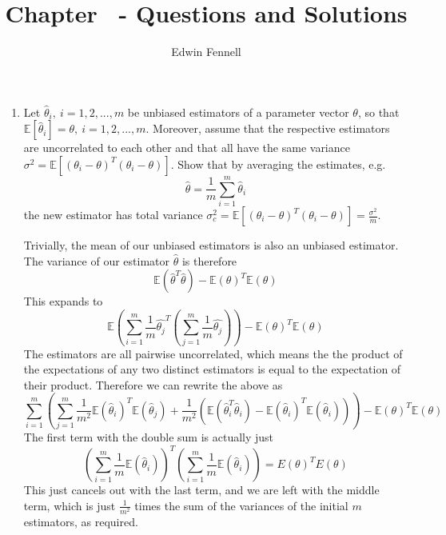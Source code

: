 \documentclass{article}
\title{Chapter \chapternumber\ - Questions and Solutions}
\author{Edwin Fennell}
\date{}
\newcommand{\chapternumber}{3}
\newenvironment{QandA}{\begin{enumerate}[label=\chapternumber.\arabic*]\bfseries\boldmath}
	{\end{enumerate}}
\newenvironment{answered}{\par\bigskip\normalfont\unboldmath}{}
\begin{document}
	
	\maketitle
	
	\noindent%
	\begin{QandA}
		\item Let $\hat{\theta}_i,\ i=1,2,...,m$ be unbiased estimators of a parameter vector $\theta$, so that $\mathbb{E}[\hat{\theta}_i]=\theta,\ i=1,2,...,m$. Moreover, assume that the respective estimators are uncorrelated to each other and that all have the same variance $\sigma^2=\mathbb{E}[(\theta_i-\theta)^T(\theta_i-\theta)]$. Show that by averaging the estimates, e.g.
		\[\hat{\theta}=\frac{1}{m}\sum_{i=1}^{m}\hat{\theta}_i\]
		the new estimator has total variance $\sigma_c^2=\mathbb{E}[(\theta_i-\theta)^T(\theta_i-\theta)]=\frac{\sigma^2}{m}$.
		\begin{answered}
			Trivially, the mean of our unbiased estimators is also an unbiased estimator. The variance of our estimator $\hat{\theta}$ is therefore
			\[\mathbb{E}(\hat{\theta}^T\hat{\theta})-\mathbb{E}(\theta)^T\mathbb{E}(\theta)\]
			This expands to
			\[\mathbb{E}\left(\sum_{i=1}^m\frac{1}{m}\hat{\theta_j}^T\left(\sum_{j=1}^m\frac{1}{m}\hat{\theta_j}\right)\right)-\mathbb{E}(\theta)^T\mathbb{E}(\theta)\]
			The estimators are all pairwise uncorrelated, which means the the product of the expectations of any two distinct estimators is equal to the expectation of their product. Therefore we can rewrite the above as
			\[\sum_{i=1}^m\left(\sum_{j=1}^m\frac{1}{m^2}\mathbb{E}(\hat{\theta}_i)^T\mathbb{E}(\hat{\theta}_j)+\frac{1}{m^2}(\mathbb{E}(\hat{\theta}_i^T\hat{\theta}_i)-\mathbb{E}(\hat{\theta}_i)^T\mathbb{E}(\hat{\theta}_i))\right) - \mathbb{E}(\theta)^T\mathbb{E}(\theta)\]
			The first term with the double sum is actually just
			\[\left( \sum_{i=1}^m\frac{1}{m}\mathbb{E}(\hat{\theta}_i)\right)^T\left( \sum_{i=1}^m\frac{1}{m}\mathbb{E}(\hat{\theta}_i)\right) = E(\theta)^TE(\theta)\]
			This just cancels out with the last term, and we are left with the middle term, which is just $\frac{1}{m^2}$ times the sum of the variances of the initial $m$ estimators, as required.
			
		\end{answered}	
	

\end{QandA}
\end{document}
